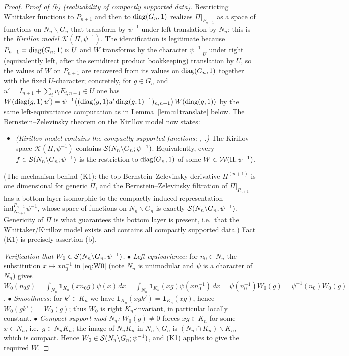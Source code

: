 \begin{proof}
\smallskip
\emph{Proof of \textup{(b)} \textup{(}realizability of compactly supported data\textup{)}.}
Restricting Whittaker functions to $P_{n+1}$ and then to $\operatorname{diag}(G_n,1)$ realizes
$\Pi|_{P_{n+1}}$ as a space of functions on $N_n\backslash G_n$ that transform by $\psi^{-1}$ under
left translation by $N_n$; this is the \emph{Kirillov model} $\mathcal K(\Pi,\psi^{-1})$. The
identification is legitimate because $P_{n+1}=\operatorname{diag}(G_n,1)\ltimes U$ and $W$ transforms by the
character $\psi^{-1}|_U$ under right \textup{(}equivalently left, after the semidirect product
bookkeeping\textup{)} translation by $U$, so the values of $W$ on $P_{n+1}$ are recovered from its
values on $\operatorname{diag}(G_n,1)$ together with the fixed $U$-character; concretely, for $g\in G_n$ and
$u'=I_{n+1}+\sum_i v_iE_{i,n+1}\in U$ one has
$W(\operatorname{diag}(g,1)\,u')=\psi^{-1}\big((\operatorname{diag}(g,1)u'\operatorname{diag}(g,1)^{-1})_{n,n+1}\big)\,
W(\operatorname{diag}(g,1))$ by the same left-equivariance computation as in
Lemma~\ref{lem:u1translate} below. The Bernstein--Zelevinsky theorem on the Kirillov model now
states:
\begin{itemize}\setlength\itemsep{2pt}
\item[(K1)] \emph{\textup{(}Kirillov model contains the compactly supported functions;
\cite[\S\S2.5,~3.5]{Bernstein}, \cite[(2.3) and \S2]{JPSS83}.\textup{)}} The Kirillov space
$\mathcal K(\Pi,\psi^{-1})$ contains $\mathcal{S}(N_n\backslash G_n;\psi^{-1})$. Equivalently, every
$f\in\mathcal{S}(N_n\backslash G_n;\psi^{-1})$ is the restriction to $\operatorname{diag}(G_n,1)$ of some
$W\in\mathcal{W}(\Pi,\psi^{-1})$.
\end{itemize}
\textup{(}The mechanism behind (K1): the top Bernstein--Zelevinsky derivative $\Pi^{(n+1)}$ is one
dimensional for generic $\Pi$, and the Bernstein--Zelevinsky filtration of $\Pi|_{P_{n+1}}$ has a
bottom layer isomorphic to the compactly induced representation
$\mathrm{ind}_{N_{n+1}}^{P_{n+1}}\psi^{-1}$, whose space of functions on $N_n\backslash G_n$ is
exactly $\mathcal{S}(N_n\backslash G_n;\psi^{-1})$. Genericity of $\Pi$ is what guarantees this bottom
layer is present, i.e.\ that the Whittaker/Kirillov model exists and contains all compactly
supported data.\textup{)} Fact (K1) is precisely assertion \textup{(b)}.

\smallskip
\emph{Verification that $W_0\in\mathcal{S}(N_n\backslash G_n;\psi^{-1})$.}
$\bullet$ \emph{Left equivariance:} for $n_0\in N_n$ the substitution $x\mapsto xn_0^{-1}$ in
\eqref{eq:W0} \textup{(}note $N_n$ is unimodular and $\psi$ is a character of $N_n$\textup{)} gives
$W_0(n_0 g)=\int_{N_n}\mathbf 1_{K_n}(xn_0g)\psi(x)\,dx=\int_{N_n}\mathbf 1_{K_n}(xg)\psi(xn_0^{-1})\,dx
=\psi(n_0^{-1})W_0(g)=\psi^{-1}(n_0)W_0(g)$.
$\bullet$ \emph{Smoothness:} for $k'\in K_n$ we have $\mathbf 1_{K_n}(xgk')=\mathbf 1_{K_n}(xg)$, hence
$W_0(gk')=W_0(g)$; thus $W_0$ is right $K_n$-invariant, in particular locally constant.
$\bullet$ \emph{Compact support mod $N_n$:} $W_0(g)\neq0$ forces $xg\in K_n$ for some $x\in N_n$,
i.e.\ $g\in N_nK_n$; the image of $N_nK_n$ in $N_n\backslash G_n$ is
$(N_n\cap K_n)\backslash K_n$, which is compact. Hence $W_0\in\mathcal{S}(N_n\backslash G_n;\psi^{-1})$,
and (K1) applies to give the required $W$.
\end{proof}

